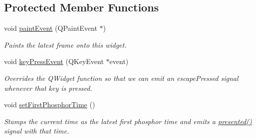 \subsection*{Protected Member Functions}
\begin{DoxyCompactItemize}
\item 
void \hyperlink{class_picto_1_1_visual_target_ae1c83e292dfd6b56e7fca9da99783c4a}{paint\-Event} (Q\-Paint\-Event $\ast$)
\begin{DoxyCompactList}\small\item\em Paints the latest frame onto this widget. \end{DoxyCompactList}\item 
void \hyperlink{class_picto_1_1_visual_target_aca5fb78dbb7243782ee6d2a2f7213c93}{key\-Press\-Event} (Q\-Key\-Event $\ast$event)
\begin{DoxyCompactList}\small\item\em Overrides the Q\-Widget function so that we can emit an escape\-Pressed signal whenever that key is pressed. \end{DoxyCompactList}\item 
void \hyperlink{class_picto_1_1_visual_target_abd0a5d10da5c642cb6e31f39635628ed}{set\-First\-Phosphor\-Time} ()
\begin{DoxyCompactList}\small\item\em Stamps the current time as the latest first phosphor time and emits a \hyperlink{class_picto_1_1_visual_target_ad04e5a944c2b5d31814ba32b2b93180e}{presented()} signal with that time. \end{DoxyCompactList}\end{DoxyCompactItemize}
